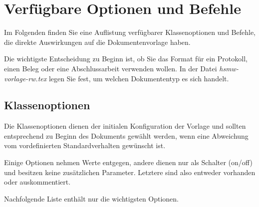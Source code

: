 \chapter{Verfügbare Optionen und Befehle}
\label{cha:optionsAndCommands}
	
Im Folgenden finden Sie eine Auflistung verfügbarer Klassenoptionen und Befehle, die direkte Auswirkungen auf die Dokumentenvorlage haben.

Die wichtigste Entscheidung zu Beginn ist, ob Sie das Format für ein Protokoll, einen Beleg oder eine Abschlussarbeit verwenden wollen. 
In der Datei \textit{hsmw-vorlage-rw.tex} legen Sie fest, um welchen Dokumententyp es sich handelt.
	
\section{Klassenoptionen}
\label{sec:klassenoption}
	
Die Klassenoptionen dienen der initialen Konfiguration der Vorlage und sollten entsprechend zu Beginn des Dokuments gewählt werden, wenn eine Abweichung vom vordefinierten Standardverhalten gewünscht ist.


Einige Optionen nehmen Werte entgegen, andere dienen nur als Schalter (on/off) und besitzen keine zusätzlichen Parameter. Letztere sind also entweder vorhanden oder auskommentiert.

Nachfolgende Liste enthält nur die wichtigsten Optionen.

